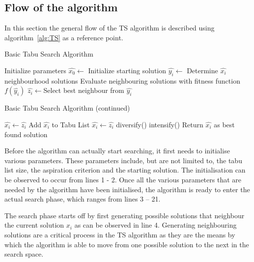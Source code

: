 \subsection{Flow of the algorithm}
In this section the general flow of the \gls{TS} algorithm is described using algorithm~\ref{alg:TS} as a reference point.
\begin{algorithm}[H]
\caption{Basic Tabu Search Algorithm\cite{TabuRCAProblem,TabuMontemanniSmith}}
\label{alg:TS}
	\begin{algorithmic}[1]
		\State Initialize parameters
    \State $\hat{x_0} \leftarrow$ Initialize starting solution
    \State $\hat{y_i} \leftarrow$ Determine $\hat{x_i}$ neighbourhood solutions 
    \State Evaluate neighbouring solutions with fitness function $f(\hat{y_i})$
    \State $\hat{z_i} \leftarrow$Select best neighbour from $\hat{y_i}$
    \end{algorithmic}
\end{algorithm}
\begin{algorithm}[H]
    \caption{Basic Tabu Search Algorithm (continued)\cite{TabuRCAProblem, TabuMontemanniSmith}}
    \begin{algorithmic}
    \State $\hat{x_i} \leftarrow \hat{z_i}$
				\EndIf
			\Else
      \State Add $\hat{x_i}$ to Tabu List
      \State $\hat{x_i} \leftarrow \hat{z_i}$
					\State diversify()
				\Else
					\State intensify()
				\EndIf
			\EndIf
		\EndWhile
    \State Return $\hat{x_i}$ as best found solution
	\end{algorithmic}
\end{algorithm}

Before the algorithm can actually start searching, it first needs to initialise various parameters. These parameters include, but are not limited to, the tabu list size, the aspiration criterion and the starting solution. The initialisation can be observed to occur from lines 1 - 2. Once all the various parameters that are needed by the algorithm have been initialised, the algorithm is ready to enter the actual search phase, which ranges from lines 3 -- 21. 

The search phase starts off by first generating possible solutions that neighbour the current solution $x_i$ as can be observed in line 4. Generating neighbouring solutions are a critical process in the \gls{TS} algorithm as they are the means by which the algorithm is able to move from one possible solution to the next in the search space.

